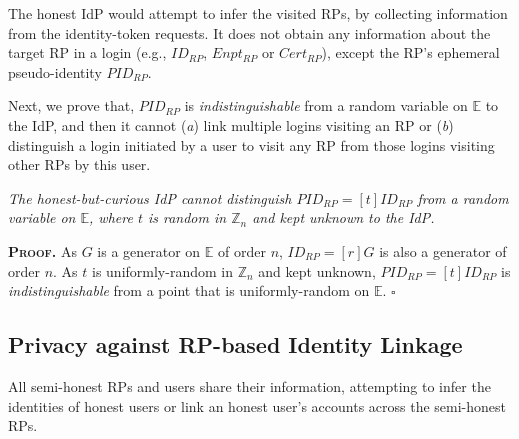 The honest IdP would attempt to infer the visited RPs,
by collecting information from the identity-token requests.
It does not obtain any information about the target RP in a login (e.g., $ID_{RP}$, $Enpt_{RP}$ or $Cert_{RP}$), except the RP's ephemeral pseudo-identity $PID_{RP}$.

Next, we prove that, $PID_{RP}$ is \emph{indistinguishable} from a random variable on $\mathbb{E}$ to the IdP,
    and then
 it cannot (\emph{a}) link multiple logins visiting an RP or (\emph{b}) distinguish a login initiated by a user to visit any RP from those logins visiting other RPs by this user. %


\vspace{1.5mm}
\begin{thm}
\emph{The honest-but-curious IdP cannot distinguish $PID_{RP} = [t]ID_{RP}$ from a random variable on $\mathbb{E}$, where $t$ is random in $\mathbb{Z}_n$ and kept unknown to the IdP.}\label{thm-idp-untraceability}
\end{thm}

\noindent\textbf{\textsc{Proof.}}
As $G$ is a generator on $\mathbb{E}$ of order $n$, $ID_{RP} = [r]G$ is also a generator of order $n$.
As $t$ is uniformly-random in $\mathbb{Z}_n$ and kept unknown, $PID_{RP} = [t]ID_{RP}$ is \emph{indistinguishable} from a point that is uniformly-random on $\mathbb{E}$.
\hfill $\square$

\vspace{1.5mm}


\subsection{Privacy against RP-based Identity Linkage}
\label{subsec:RP-privacy}

All semi-honest RPs and users share their information, attempting to infer the identities of honest users or link an honest user's accounts across the semi-honest RPs.


